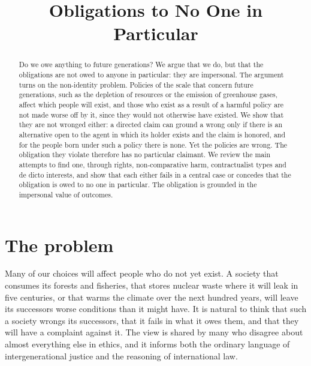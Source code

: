 \documentclass{situationist-preprint}
\title{Obligations to No One in Particular}
\begin{document}
\maketitle

\begin{abstract}
Do we owe anything to future generations? We argue that we do, but that the obligations are not owed to anyone in particular: they are impersonal. The argument turns on the non-identity problem. Policies of the scale that concern future generations, such as the depletion of resources or the emission of greenhouse gases, affect which people will exist, and those who exist as a result of a harmful policy are not made worse off by it, since they would not otherwise have existed. We show that they are not wronged either: a directed claim can ground a wrong only if there is an alternative open to the agent in which its holder exists and the claim is honored, and for the people born under such a policy there is none. Yet the policies are wrong. The obligation they violate therefore has no particular claimant. We review the main attempts to find one, through rights, non-comparative harm, contractualist types and de dicto interests, and show that each either fails in a central case or concedes that the obligation is owed to no one in particular. The obligation is grounded in the impersonal value of outcomes.
\end{abstract}

\section{The problem}

Many of our choices will affect people who do not yet exist. A society that consumes its forests and fisheries, that stores nuclear waste where it will leak in five centuries, or that warms the climate over the next hundred years, will leave its successors worse conditions than it might have. It is natural to think that such a society wrongs its successors, that it fails in what it owes them, and that they will have a complaint against it. The view is shared by many who disagree about almost everything else in ethics, and it informs both the ordinary language of intergenerational justice and the reasoning of international law.
\end{document}
